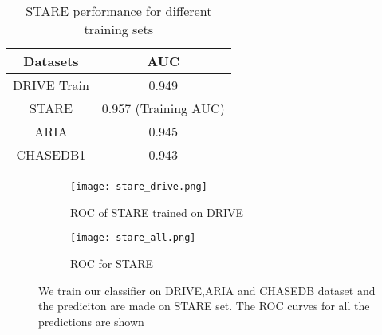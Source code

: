 \begin{table}
	\caption{STARE performance for different training sets}
	\centering
	\label{table:auccompare}
	\begin{tabular}{c c  }
		\toprule
		{Datasets} & {AUC}   \\ \hline
		
		DRIVE Train & 0.949 \\
		
		STARE& 0.957 (Training AUC)  \\
		
		ARIA & 0.945 \\
		
		CHASEDB1 & 0.943 \\
		
		\bottomrule
	\end{tabular}
\end{table}


\begin{figure}
	\centering
	\begin{subfigure}[b]{0.8\textwidth}
		\texttt{[image: stare\_drive.png]}
		\caption{ROC of STARE trained  on DRIVE}
		\label{fig:str}
	\end{subfigure}
	\begin{subfigure}[b]{0.8\textwidth}
		\texttt{[image: stare\_all.png]}
		\caption{ROC for STARE}
		\label{fig:str1}
	\end{subfigure}

	\caption[Cross training comparison for STARE dataset]{We train our classifier on DRIVE,ARIA and CHASEDB dataset and the prediciton are made on STARE set. The ROC curves for all the predictions are shown}
	\label{fig:comparestare}
\end{figure}